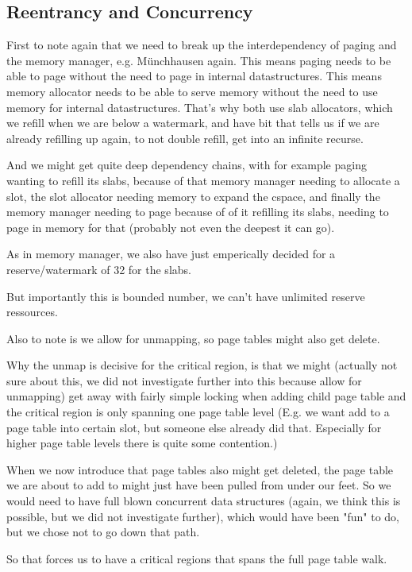 \subsection{Reentrancy and Concurrency} \label{pag-con}

First to note again that we need to break up the interdependency of paging and
the memory manager, e.g. Münchhausen again.
This means paging needs to be able to page without the need to page in internal
datastructures.
This means memory allocator needs to be able to serve memory without the need to
use memory for internal datastructures.
That's why both use slab allocators, which we refill when we are below a
watermark, and have bit that tells us if we are already refilling up again, to
not double refill, get into an infinite recurse.

And we might get quite deep dependency chains, with for example paging wanting
to refill its slabs, because of that memory manager needing to allocate a slot,
the slot allocator needing memory to expand the cspace, and finally the memory
manager needing to page because of of it refilling its slabs, needing to page in
memory for that (probably not even the deepest it can go).

As in memory manager, we also have just emperically decided for a
reserve/watermark of 32 for the slabs.

But importantly this is bounded number, we can't have unlimited reserve
ressources.

Also to note is we allow for unmapping, so page tables might also get delete.

Why the unmap is decisive for the critical region, is that we might
(actually not sure about this, we did not investigate further into this because allow for
unmapping)
get away with fairly simple locking when adding child page table and the
critical region is only spanning one page table level
(E.g. we want add to a page table into certain slot, but someone else already
did that.
Especially for higher page table levels there is quite some contention.)

When we now introduce that page tables also might get deleted, the page table we
are about to add to might just have been pulled from under our feet.
So we would need to have full blown concurrent data structures (again, we think
this is possible, but we did not investigate further), which would have
been "fun" to do, but we chose not to go down that path.

So that forces us to have a critical regions that spans the full page table
walk.

